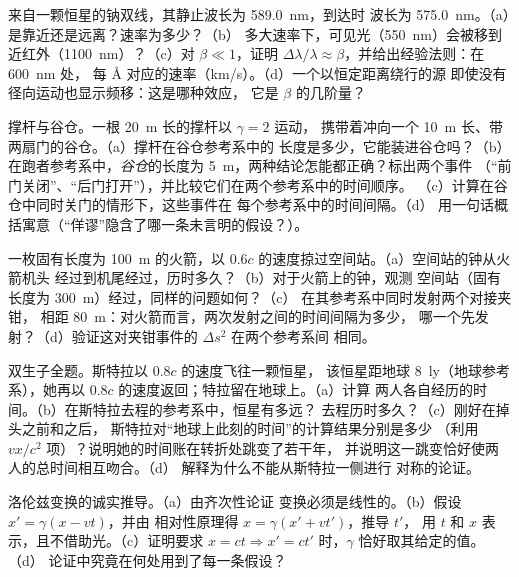 \begin{exercise}[$\star\star$]\label{exo:b3:relativistic-kinematics:7}
来自一颗恒星的钠双线，其静止波长为 \qty{589.0}{nm}，到达时
波长为 \qty{575.0}{nm}。（a）是靠近还是远离？速率为多少？（b）
多大速率下，可见光（\qty{550}{nm}）会被移到
近红外（\qty{1100}{nm}）？（c）对 $\beta \ll 1$，证明
$\Delta\lambda/\lambda \approx \beta$，并给出经验法则：在 \qty{600}{nm} 处，
每 \unit{\angstrom} 对应的速率（km/s）。（d）一个以恒定距离绕行的源
即使没有径向运动也显示频移：这是哪种效应，
它是 $\beta$ 的几阶量？
\end{exercise}

\begin{exercise}[$\star\star$]\label{exo:b3:relativistic-kinematics:8}
撑杆与谷仓。一根 \qty{20}{m} 长的撑杆以 $\gamma = 2$ 运动，
携带着冲向一个 \qty{10}{m} 长、带两扇门的谷仓。（a）撑杆在谷仓参考系中的
长度是多少，它能装进谷仓吗？（b）在跑者参考系中，\emph{谷仓}的长度为
\qty{5}{m}，两种结论怎能都正确？标出两个事件
（“前门关闭”、“后门打开”），并比较它们在两个参考系中的时间顺序。
（c）计算在谷仓中同时关门的情形下，这些事件在
每个参考系中的时间间隔。（d）
用一句话概括寓意（“佯谬”隐含了哪一条未言明的假设？）。
\end{exercise}

\begin{exercise}[$\star\star$]\label{exo:b3:relativistic-kinematics:9}
一枚固有长度为 \qty{100}{m} 的火箭，以
$0.6c$ 的速度掠过空间站。（a）空间站的钟从火箭机头
经过到机尾经过，历时多久？（b）对于火箭上的钟，观测
空间站（固有长度为 \qty{300}{m}）经过，同样的问题如何？（c）
在其参考系中同时发射两个对接夹钳，
相距 \qty{80}{m}：对火箭而言，两次发射之间的时间间隔为多少，
哪一个先发射？（d）验证这对夹钳事件的 $\Delta s^2$ 在两个参考系间
相同。
\end{exercise}

\begin{exercise}[$\star\star\star$]\label{exo:b3:relativistic-kinematics:10}
双生子全题。斯特拉以 $0.8c$ 的速度飞往一颗恒星，
该恒星距地球 \qty{8}{ly}（地球参考系），她再以 $0.8c$ 的速度返回；特拉留在地球上。（a）计算
两人各自经历的时间。（b）在斯特拉去程的参考系中，恒星有多远？
去程历时多久？（c）刚好在掉头之前和之后，
斯特拉对“地球上此刻的时间”的计算结果分别是多少
（利用 $vx/c^2$ 项）？说明她的时间账在转折处跳变了若干年，
并说明这一跳变恰好使两人的总时间相互吻合。（d）
解释为什么不能从斯特拉一侧进行
对称的论证。
\end{exercise}

\begin{exercise}[$\star\star\star$]\label{exo:b3:relativistic-kinematics:11}
洛伦兹变换的诚实推导。（a）由齐次性论证
变换必须是线性的。（b）假设 $x' = \gamma(x - vt)$，并由
相对性原理得 $x = \gamma(x' + vt')$，推导 $t'$，
用 $t$ 和 $x$ 表示，且不借助光。（c）证明要求
$x = ct \Rightarrow x' = ct'$ 时，$\gamma$ 恰好取其给定的值。（d）
论证中究竟在何处用到了每一条假设？
\end{exercise}

